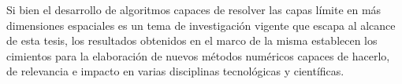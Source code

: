 Si bien el desarrollo de algoritmos capaces de resolver las capas límite 
en más dimensiones espaciales es un tema de investigación vigente que escapa 
al alcance de esta tesis, los resultados obtenidos en el marco de la misma 
establecen los cimientos para la elaboración de nuevos métodos numéricos 
capaces de hacerlo, de relevancia e impacto en varias disciplinas tecnológicas 
y científicas. 


